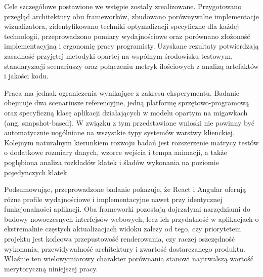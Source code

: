 \documentclass[12pt,openright,twoside]{report}
\begin{document}
Cele szczegółowe postawione we wstępie zostały zrealizowane. Przygotowano przegląd architektury obu frameworków, zbudowano porównywalne implementacje wizualizatora, zidentyfikowano techniki optymalizacji specyficzne dla każdej technologii, przeprowadzono pomiary wydajnościowe oraz porównano złożoność implementacyjną i ergonomię pracy programisty. Uzyskane rezultaty potwierdzają zasadność przyjętej metodyki opartej na wspólnym środowisku testowym, standaryzacji scenariuszy oraz połączeniu metryk ilościowych z analizą artefaktów i jakości kodu.

Praca ma jednak ograniczenia wynikające z zakresu eksperymentu. Badanie obejmuje dwa scenariusze referencyjne, jedną platformę sprzętowo-programową oraz specyficzną klasę aplikacji działających w modelu opartym na migawkach (ang. snapshot-based). W związku z tym przedstawione wnioski nie powinny być automatycznie uogólniane na wszystkie typy systemów warstwy klienckiej. Kolejnym naturalnym kierunkiem rozwoju badań jest rozszerzenie matrycy testów o dodatkowe rozmiary danych, wzorce wejścia i tempa animacji, a także pogłębiona analiza rozkładów klatek i śladów wykonania na poziomie pojedynczych klatek.

Podsumowując, przeprowadzone badanie pokazuje, że React i Angular oferują różne profile wydajnościowe i implementacyjne nawet przy identycznej funkcjonalności aplikacji. Oba frameworki pozostają dojrzałymi narzędziami do budowy nowoczesnych interfejsów webowych, lecz ich przydatność w aplikacjach o ekstremalnie częstych aktualizacjach widoku zależy od tego, czy priorytetem projektu jest końcowa przepustowość renderowania, czy raczej oszczędność wykonania, przewidywalność architektury i zwartość dostarczanego produktu. Właśnie ten wielowymiarowy charakter porównania stanowi najtrwalszą wartość merytoryczną niniejszej pracy.

\clearpage
{}
{}
\renewcommand{\bibname}{BIBLIOGRAFIA}
\printbibliography

\clearpage
{}
{}
\listoffigures

\clearpage
{}
{}
\listoftables
\end{document}

